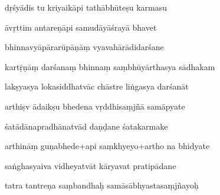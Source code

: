 \documentclass[article,12pt,a4paper]{memoir}%
\newcounter{parCount}
\begin{document}
	  
	  \pstart {} dṛśyādis tu kriyaikāpi tathābhūteṣu karmasu 
	{}
	\pend%
      

	  
	  \pstart \leavevmode%
	āvṛttim antareṇāpi samudāyāśrayā bhavet 
	{}
	\pend%
      

	  
	  \pstart {} bhinnavyāpārarūpāṇāṃ vyavahārādidarśane 
	{}
	\pend%
      

	  
	  \pstart \leavevmode%
	kartṝṇāṃ darśanaṃ bhinnaṃ saṃbhūyārthasya sādhakam 
	{}
	\pend%
      

	  
	  \pstart {} lakṣyasya lokasiddhatvāc chāstre liṅgasya darśanāt 
	{}
	\pend%
      

	  
	  \pstart \leavevmode%
	arthiṣv ādaikṣu bhedena vṛddhisaṃjñā samāpyate 
	{}
	\pend%
      

	  
	  \pstart {} śatādānapradhānatvād daṇḍane śatakarmake 
	{}
	\pend%
      

	  
	  \pstart \leavevmode%
	arthināṃ guṇabhede+api saṃkhyeyo+artho na bhidyate 
	{}
	\pend%
      

	  
	  \pstart {} saṅghasyaiva vidheyatvāt kāryavat pratipādane 
	{}
	\pend%
      

	  
	  \pstart \leavevmode%
	tatra tantreṇa saṃbandhaḥ samāsābhyastasaṃjñayoḥ 
	{}
	\pend%
      
\end{document}
